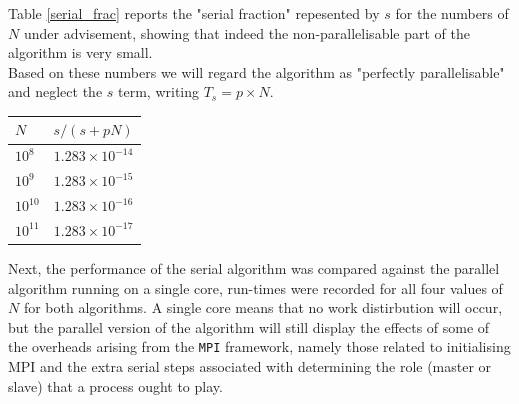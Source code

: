 \documentclass{article}
\begin{document}
Table \ref{serial_frac} reports the "serial fraction" repesented by $s$ for the numbers of $N$ under advisement, showing that indeed the non-parallelisable part of the algorithm is very small.\\
Based on these numbers we will regard the algorithm as "perfectly parallelisable" and neglect the $s$ term, writing $T_s = p \times N$.

\begin{center}
\label{serial_frac}
 \begin{tabular}{|l | c | } 
 \hline
 $N$ & $ s / \left( s + pN \right) $  \\ 
 \hline
 \hline
 $10^{8}$ & $1.283\times 10^{-14}$ \\
 \hline
 $10^{9}$ &  $1.283\times 10^{-15}$\\
 \hline
 $10^{10}$ &  $1.283\times 10^{-16}$\\
 \hline
 $10^{11}$ &  $1.283\times 10^{-17}$\\
 \hline
\end{tabular}
\end{center}



Next, the performance of the serial algorithm was compared against the parallel algorithm running on a single core, run-times were recorded for all four values of $N$ for both algorithms. A single core means that no work distirbution will occur, but the parallel version of the algorithm will still display the effects of some of the overheads arising from the \verb|MPI| framework, namely those related to initialising MPI and the extra serial steps associated with determining the role (master or slave) that a process ought to play.
\end{document}
